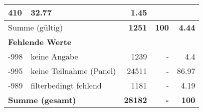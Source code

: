 \begin{longtable}{lXrrr}
       \num{410} &
       \num[round-mode=places,round-precision=2]{32,77} &
         \num[round-mode=places,round-precision=2]{1,45} \\
     \midrule
     \multicolumn{2}{l}{Summe (gültig)} &
       \textbf{\num{1251}} &
     \textbf{100} &
       \textbf{\num[round-mode=places,round-precision=2]{4,44}} \\
     \multicolumn{5}{l}{\textbf{Fehlende Werte}}\\
       -998 &
       keine Angabe &
         \num{1239} &
        - &
         \num[round-mode=places,round-precision=2]{4,4} \\
       -995 &
       keine Teilnahme (Panel) &
         \num{24511} &
        - &
         \num[round-mode=places,round-precision=2]{86,97} \\
       -989 &
       filterbedingt fehlend &
         \num{1181} &
        - &
         \num[round-mode=places,round-precision=2]{4,19} \\
     \midrule
     \multicolumn{2}{l}{\textbf{Summe (gesamt)}} &
          \textbf{\num{28182}} &
        \textbf{-} &
        \textbf{100} \\
     \bottomrule
     \end{longtable}
     
